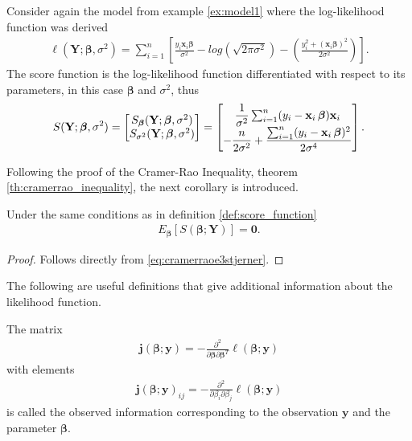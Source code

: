 \begin{example}
Consider again the model from example \ref{ex:model1} where the log-likelihood function was derived
\begin{align*}
   \ell(\textbf{Y};\boldsymbol{\beta}, \sigma^2) = \sum_{i = 1}^n \left[\frac{y_i \textbf{x}_i\boldsymbol{\beta}}{\sigma^2} - log\left( \sqrt{2 \pi \sigma^2}\right) - \left( \frac{y_i^2 + (\textbf{x}_i\boldsymbol{\beta})^2}{2\sigma^2} \right) \right].
\end{align*}
The score function is the log-likelihood function differentiated with respect to its parameters, in this case $\boldsymbol{\beta}$ and $\sigma^2$, thus
\begin{align*}
    S(\textbf{Y}; \operatorname{\boldsymbol{\beta}}, \sigma^2) = 
    \begin{bmatrix}
        S_{\operatorname{\boldsymbol{\beta}}} (\textbf{Y}; \operatorname{\boldsymbol{\beta}}, \sigma^2) \\
        S_{\sigma^2}(\textbf{Y}; \operatorname{\boldsymbol{\beta}}, \sigma^2)
    \end{bmatrix}
    =
    \begin{bmatrix}
        \dfrac{1}{\sigma^2} \sum_{i=1}^n (y_i - \textbf{x}_i \operatorname{\boldsymbol{\beta}}) \textbf{x}_i \\
        - \dfrac{n}{2 \sigma^2} + \dfrac{\sum_{i=1}^n (y_i - \textbf{x}_i \operatorname{\boldsymbol{\beta}})^2}{2 \sigma^4}
    \end{bmatrix}.
\end{align*}
\end{example}
Following the proof of the Cramer-Rao Inequality, theorem \ref{th:cramerrao_inequality}, the next corollary is introduced.
\begin{corollary}
Under the same conditions as in definition \ref{def:score_function}
\begin{align} \label{eq:corollary}
    E_{\boldsymbol{\beta}}[S(\boldsymbol{\beta}; \textbf{Y})] = \textbf{0}.
\end{align}
\end{corollary}
\begin{proof}
Follows directly from \eqref{eq:cramerraoe3stjerner}.
\end{proof}
The following are useful definitions that give additional information about the likelihood function.
\begin{definition} 
\label{def:observed_information}
The matrix
\begin{align} \label{eq:Observed_information}
    \textbf{j}(\boldsymbol{\beta};\textbf{y}) = - \frac{\partial^2}{\partial \boldsymbol{\beta} \partial \boldsymbol{\beta}^T} \ell(\boldsymbol{\beta}; \textbf{y})
\end{align}
with elements
\begin{align*}
    \textbf{j}(\boldsymbol{\beta};\textbf{y})_{ij} = - \frac{\partial^2}{\partial \beta_i \partial \beta_j} \ell(\boldsymbol{\beta}; \textbf{y})
\end{align*}
is called the observed information corresponding to the observation $\textbf{y}$ and the parameter $\boldsymbol{\beta}$.
\end{definition}
